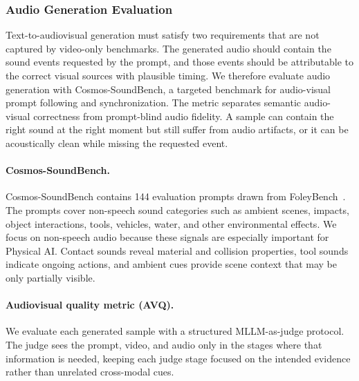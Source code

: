 \subsubsection{Audio Generation Evaluation}
\label{subsec::audio_eval}
Text-to-audiovisual generation must satisfy two requirements that are not captured by video-only benchmarks. The generated audio should contain the sound events requested by the prompt, and those events should be attributable to the correct visual sources with plausible timing. We therefore evaluate audio generation with Cosmos-SoundBench, a targeted benchmark for audio-visual prompt following and synchronization. The metric separates semantic audio-visual correctness from prompt-blind audio fidelity. A sample can contain the right sound at the right moment but still suffer from audio artifacts, or it can be acoustically clean while missing the requested event.

\paragraph{Cosmos-SoundBench.}
Cosmos-SoundBench contains 144 evaluation prompts drawn from FoleyBench~\citep{foleybench}. The prompts cover non-speech sound categories such as ambient scenes, impacts, object interactions, tools, vehicles, water, and other environmental effects. We focus on non-speech audio because these signals are especially important for Physical AI. Contact sounds reveal material and collision properties, tool sounds indicate ongoing actions, and ambient cues provide scene context that may be only partially visible.

\paragraph{Audiovisual quality metric (AVQ).}
We evaluate each generated sample with a structured MLLM-as-judge protocol. The judge sees the prompt, video, and audio only in the stages where that information is needed, keeping each judge stage focused on the intended evidence rather than unrelated cross-modal cues.

